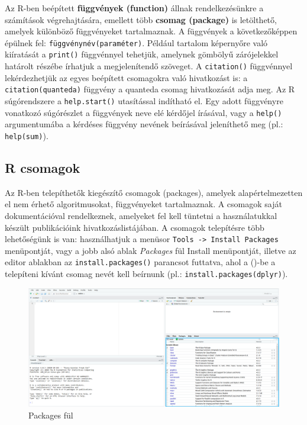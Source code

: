 \documentclass[
]{book}
\begin{document}
Az R-ben beépített \textbf{függvények (function)} állnak
rendelkezésünkre a számítások végrehajtására, emellett több
\textbf{csomag (package)} is letölthető, amelyek különböző függvényeket
tartalmaznak. A függvények a következőképpen épülnek fel:
\texttt{függvénynév(paraméter)}. Például tartalom képernyőre való
kiíratását a \texttt{print()} függvénnyel tehetjük, amelynek gömbölyű
zárójelekkel határolt részébe írhatjuk a megjelenítendő szöveget. A
\texttt{citation()} függvénnyel lekérdezhetjük az egyes beépített
csomagokra való hivatkozást is: a \texttt{citation(quanteda)} függvény a
quanteda csomag hivatkozását adja meg. Az R súgórendszere a
\texttt{help.start()} utasítással indítható el. Egy adott függvényre
vonatkozó súgórészlet a függvények neve elé kérdőjel írásával, vagy a
\texttt{help()} argumentumába a kérdéses függvény nevének beírásával
jeleníthető meg (pl.: \texttt{help(sum)}).

\hypertarget{packages}{%
\subsection{R csomagok}\label{packages}}

Az R-ben telepíthetők kiegészítő csomagok (packages), amelyek
alapértelmezetten el nem érhető algoritmusokat, függvényeket
tartalmaznak. A csomagok saját dokumentációval rendelkeznek, amelyeket
fel kell tüntetni a használatukkal készült publikációink
hivatkozáslistájában. A csomagok telepítésre több lehetőségünk is van:
használhatjuk a menüsor
\texttt{Tools\ -\textgreater{}\ Install\ Packages} menüpontját, vagy a
jobb alsó ablak \emph{Packages} fül Install menüpontját, illetve az
editor ablakban az \texttt{install.packages()} parancsot futtatva, ahol
a ()-be a telepíteni kívánt csomag nevét kell beírnunk (pl.:
\texttt{install.packages(dplyr)}).

\begin{figure}

{\centering \includegraphics{figures/13-04_packages} 

}

\caption{Packages fül}\label{fig:unnamed-chunk-20}
\end{figure}
\end{document}
